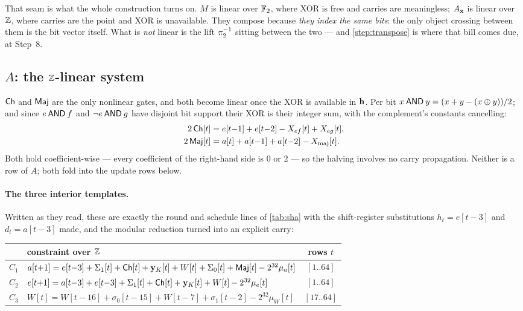 That seam is what the whole construction turns on. $M$ is linear over $\mathbb{F}_2$,
where XOR is free and carries are meaningless; $A_{\mathbf{x}}$ is linear over $\mathbb{Z}$, where
carries are the point and XOR is unavailable. They compose because \emph{they
index the same bits}: the only object crossing between them is the bit vector
itself. What is \emph{not} linear is the lift $\pi_2^{-1}$ sitting between the
two --- and \cref{step:transpose} is where that bill comes due, at Step~8.

\subsection{$A$: the \texorpdfstring{$\mathbb{Z}$}{Z}-linear system}\label{sec:Amatrix}

$\mathsf{Ch}$ and $\mathsf{Maj}$ are the only nonlinear gates, and both become linear once the
XOR is available in $\mathbf{h}$. Per bit $x\mathbin{\mathsf{AND}} y=(x+y-(x\oplus y))/2$; and since
$e\mathbin{\mathsf{AND}} f$ and $\mathsf{\neg} e\mathbin{\mathsf{AND}} g$ have disjoint bit support their XOR is their
integer sum, with the complement's constants cancelling:
\begin{align}
  2\,\mathsf{Ch}[t]  &= e[t{-}1] + e[t{-}2] - X_{ef}[t] + X_{eg}[t], \label{eq:ch}\\
  2\,\mathsf{Maj}[t] &= a[t] + a[t{-}1] + a[t{-}2] - X_{\mathrm{maj}}[t]. \label{eq:maj}
\end{align}
Both hold coefficient-wise --- every coefficient of the right-hand side is $0$ or
$2$ --- so the halving involves no carry propagation. Neither is a row of $A$;
both fold into the update rows below.

\paragraph{The three interior templates.} Written as they read, these are
exactly the round and schedule lines of \cref{tab:sha} with the shift-register
substitutions $h_t=e[t{-}3]$ and $d_t=a[t{-}3]$ made, and the modular reduction
turned into an explicit carry:

\begin{center}\small
\begin{tabular}{@{}llc@{}}
\toprule
& constraint over $\mathbb{Z}$ & rows $t$\\
\midrule
$C_1$ & $a[t{+}1] = e[t{-}3] + \Sigma_1[t] + \mathsf{Ch}[t] + \mathbf y_K[t] + W[t]
        + \Sigma_0[t] + \mathsf{Maj}[t] - 2^{32}\mu_a[t]$ & $[1..64]$\\[3pt]
$C_2$ & $e[t{+}1] = a[t{-}3] + e[t{-}3] + \Sigma_1[t] + \mathsf{Ch}[t]
        + \mathbf y_K[t] + W[t] - 2^{32}\mu_e[t]$ & $[1..64]$\\[3pt]
$C_3$ & $W[t] = W[t{-}16] + \sigma_0[t{-}15] + W[t{-}7] + \sigma_1[t{-}2]
        - 2^{32}\mu_W[t]$ & $[17..64]$\\
\bottomrule
\end{tabular}
\end{center}

